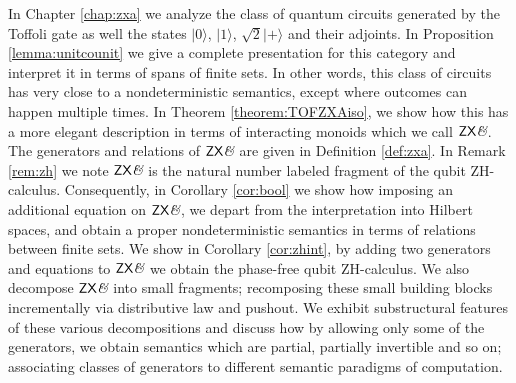 In Chapter \ref{chap:zxa} we analyze the class of quantum circuits generated by the Toffoli gate as well the states $|0\rangle$, $|1\rangle$, $\sqrt{2}|+\rangle$ and their adjoints.  In Proposition \ref{lemma:unitcounit} we give a complete presentation for this category and interpret it in terms of spans of finite sets.  In other words, this class of circuits has very close to a nondeterministic semantics, except where outcomes can happen multiple times.  In Theorem \ref{theorem:TOFZXAiso}, we show how this has a more elegant  description in terms of interacting monoids which we call $\mathsf{ZX}\textit{\&}$.  The generators and relations of $\mathsf{ZX}\textit{\&}$ are given in Definition \ref{def:zxa}.    In Remark \ref{rem:zh} we note $\mathsf{ZX}\textit{\&}$  is the natural number labeled fragment of the qubit ZH-calculus.  Consequently, in Corollary \ref{cor:bool} we show how  imposing an additional equation on $\mathsf{ZX}\textit{\&}$, we depart from the interpretation into Hilbert spaces, and obtain a proper  nondeterministic semantics in terms of relations between finite sets.  We show in Corollary \ref{cor:zhint}, by adding two generators and equations to $\mathsf{ZX}\textit{\&}$  we obtain the phase-free qubit ZH-calculus.
We also decompose $\mathsf{ZX}\textit{\&}$  into small fragments; recomposing these small building blocks incrementally via distributive law and pushout.
We exhibit substructural features of these various decompositions and discuss how by allowing only some of the generators, we obtain semantics which are partial, partially invertible and so on; associating classes of generators to different semantic paradigms of computation.


